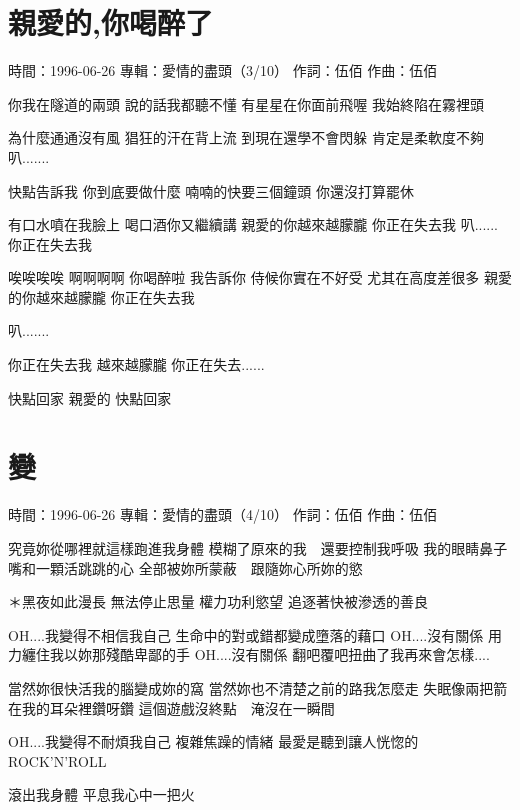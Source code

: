 \documentclass[UTF8,a4paper,oneside,twocolumn,12pt]{ctexbook}
\newcommand{\infopair}[2]{\textbullet #1：#2}
\newcommand{\zc}[1][伍佰]{\infopair{作詞}{#1}}
\newcommand{\zq}[1][伍佰]{\infopair{作曲}{#1}}
\newcommand{\zj}[1]{\infopair{專輯}{#1}}
\newcommand{\sj}[1]{\infopair{時間}{#1}}
\newenvironment{info}{\begin{flushleft}\kaishu
	}
	{\end{flushleft}\normalsize\yahei\par}
\newenvironment{lyric}{
	}
{}
\begin{document}
\section{親愛的,你喝醉了}
\begin{info}
	\sj{1996-06-26}
	\zj{愛情的盡頭（3/10）}
	\zc
	\zq
\end{info}
\begin{lyric}
	你我在隧道的兩頭
	說的話我都聽不懂
	有星星在你面前飛喔
	我始終陷在霧裡頭

	為什麼通通沒有風
	猖狂的汗在背上流
	到現在還學不會閃躲
	肯定是柔軟度不夠
	叭.......

	快點告訴我
	你到底要做什麼
	喃喃的快要三個鐘頭
	你還沒打算罷休

	有口水噴在我臉上
	喝口酒你又繼續講
	親愛的你越來越朦朧
	你正在失去我
	叭......
	你正在失去我

	唉唉唉唉
	啊啊啊啊
	你喝醉啦
	我告訴你
	侍候你實在不好受
	尤其在高度差很多
	親愛的你越來越朦朧
	你正在失去我

	叭.......

	你正在失去我
	越來越朦朧
	你正在失去......

	快點回家 親愛的
	快點回家
\end{lyric}

\section{變}
\begin{info}
	\sj{1996-06-26}
	\zj{愛情的盡頭（4/10）}
	\zc
	\zq
\end{info}
\begin{lyric}
	究竟妳從哪裡就這樣跑進我身體
	模糊了原來的我　還要控制我呼吸
	我的眼睛鼻子嘴和一顆活跳跳的心
	全部被妳所蒙蔽　跟隨妳心所妳的慾

	＊黑夜如此漫長
	無法停止思量
	權力功利慾望
	追逐著快被滲透的善良

	OH....我變得不相信我自己
	生命中的對或錯都變成墮落的藉口
	OH....沒有關係
	用力纏住我以妳那殘酷卑鄙的手
	OH....沒有關係
	翻吧覆吧扭曲了我再來會怎樣....

	當然妳很快活我的腦變成妳的窩
	當然妳也不清楚之前的路我怎麼走
	失眠像兩把箭在我的耳朵裡鑽呀鑽
	這個遊戲沒終點　淹沒在一瞬間

	OH....我變得不耐煩我自己
	複雜焦躁的情緒
	最愛是聽到讓人恍惚的ROCK'N'ROLL

	滾出我身體
	平息我心中一把火
\end{lyric}
\end{document}
